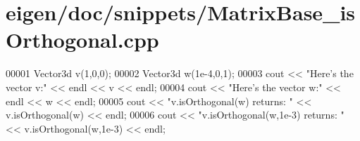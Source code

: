 \hypertarget{eigen_2doc_2snippets_2_matrix_base__is_orthogonal_8cpp_source}{}\section{eigen/doc/snippets/\+Matrix\+Base\+\_\+is\+Orthogonal.cpp}
\label{eigen_2doc_2snippets_2_matrix_base__is_orthogonal_8cpp_source}

\begin{DoxyCode}
00001 Vector3d v(1,0,0);
00002 Vector3d w(1e-4,0,1);
00003 cout << \textcolor{stringliteral}{"Here's the vector v:"} << endl << v << endl;
00004 cout << \textcolor{stringliteral}{"Here's the vector w:"} << endl << w << endl;
00005 cout << \textcolor{stringliteral}{"v.isOrthogonal(w) returns: "} << v.isOrthogonal(w) << endl;
00006 cout << \textcolor{stringliteral}{"v.isOrthogonal(w,1e-3) returns: "} << v.isOrthogonal(w,1e-3) << endl;
\end{DoxyCode}
